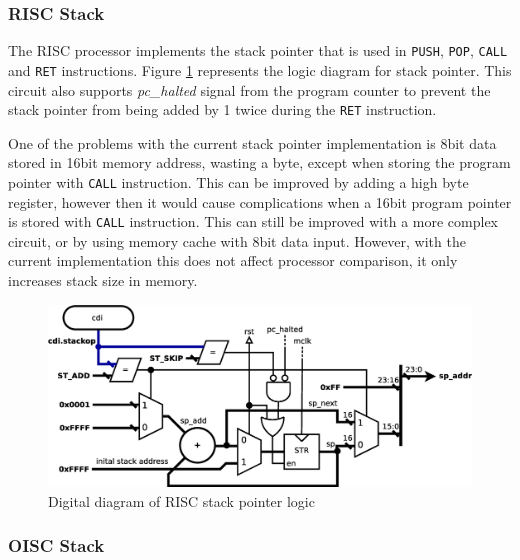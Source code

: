 \subsubsection{RISC Stack}
The RISC processor implements the stack pointer that is used in \texttt{PUSH}, \texttt{POP}, \texttt{CALL} and \texttt{RET} instructions. Figure \ref{fig:risc_stack} represents the logic diagram for stack pointer. This circuit also supports \textit{pc\_halted} signal from the program counter to prevent the stack pointer from being added by 1 twice during the \texttt{RET} instruction. 

One of the problems with the current stack pointer implementation is 8bit data stored in 16bit memory address, wasting a byte, except when storing the program pointer with \texttt{CALL} instruction. This can be improved by adding a high byte register, however then it would cause complications when a 16bit program pointer is stored with \texttt{CALL} instruction. This can still be improved with a more complex circuit, or by using memory cache with 8bit data input. However, with the current implementation this does not affect processor comparison, it only increases stack size in memory.

\begin{figure}
	\centering
	\includegraphics[scale=0.4]{../resources/risc_stack.eps}
	\caption{Digital diagram of RISC stack pointer logic}
	\label{fig:risc_stack}
\end{figure}

\subsubsection{OISC Stack}

